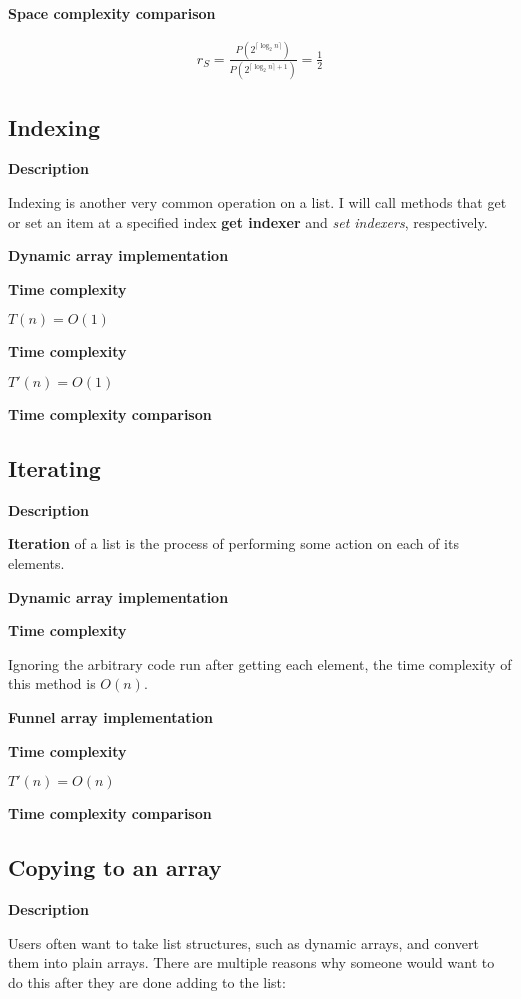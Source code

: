 \documentclass{article}
\newcommand{\descriptn}{\textbf{Description}}
\newcommand{\dynarrayimpl}{\textbf{Dynamic array implementation}}
\newcommand{\funarrayimpl}{\textbf{Funnel array implementation}}
\newcommand{\tcomplex}{\textbf{Time complexity}}
\newcommand{\tcomplexcmp}{\textbf{Time complexity comparison}}
\newcommand{\scomplexcmp}{\textbf{Space complexity comparison}}
\newcommand{\timefn}{T}
\newcommand{\spacefn}{S}
\newcommand{\timenewfn}{\timefn'}
\newcommand{\spaceratio}{r_\spacefn}
\newcommand{\bigo}{O}
\newcommand{\biggo}{P}
\newcommand{\varnitems}{n}
\begin{document}
	\scomplexcmp
	
	\begin{align*}
	\spaceratio = \frac {\biggo(2^{\lceil \log_2 \varnitems \rceil})} {\biggo(2^{\lceil \log_2 \varnitems \rceil + 1})} = \frac{1}{2}
	\end{align*}
	
	\subsection{Indexing}
	
	\descriptn
	
	Indexing is another very common operation on a list. I will call methods that get or set an item at a specified index \textbf{get indexer} and \textit{set indexers}, respectively.
	
	\dynarrayimpl
	
	\tcomplex
	
	$\timefn(\varnitems) = \bigo(1)$
	
	
	\tcomplex
	
	$\timenewfn(\varnitems) = \bigo(1)$
	
	\tcomplexcmp
	
	\subsection{Iterating}
	
	\descriptn
	
	\textbf{Iteration} of a list is the process of performing some action on each of its elements.
	
	\dynarrayimpl
	
	\tcomplex
	
	Ignoring the arbitrary code run after getting each element, the time complexity of this method is $\bigo(\varnitems)$.
	
	\funarrayimpl
	
	\tcomplex
	
	$\timenewfn(\varnitems) = \bigo(\varnitems)$
	
	\tcomplexcmp
	
	\subsection{Copying to an array}
	
	\descriptn
	
	Users often want to take list structures, such as dynamic arrays, and convert them into plain arrays. There are multiple reasons why someone would want to do this after they are done adding to the list:
	
\end{document}
